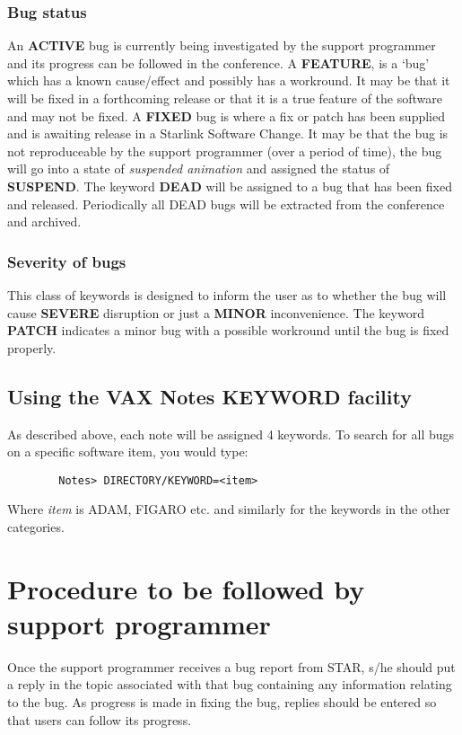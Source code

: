 \documentclass[twoside,11pt]{article}
\begin{document}
\subsubsection{Bug status}
An {\bf ACTIVE} bug is currently being investigated by the support programmer
and its progress can be followed in the conference. A {\bf FEATURE}, is a `bug'
which has a known cause/effect and possibly has a workround. 
It may be that it will be
fixed in a forthcoming release or that it is a true feature of the software and
may not be fixed. A {\bf FIXED} bug is where a fix or patch has been supplied 
and is awaiting release in a Starlink Software Change. It may be that the bug 
is not reproduceable by the support programmer (over a period of time), the 
bug will go into a state of {\em suspended animation} and assigned the status 
of {\bf SUSPEND}. The keyword {\bf DEAD} will be assigned to a bug that has
been fixed and released. Periodically all DEAD bugs will be extracted from the
conference and archived.
\subsubsection{Severity of bugs}
This class of keywords is designed to inform the user as to whether the bug
will cause {\bf SEVERE} disruption or just a {\bf MINOR} inconvenience. The
keyword {\bf PATCH} indicates a minor bug with a possible workround 
until the bug is fixed properly.
\subsection{Using the VAX Notes KEYWORD facility}
As described above, each note will be assigned 4 keywords. To search for all
bugs on a specific software item, you would type:
\begin{verbatim}
        Notes> DIRECTORY/KEYWORD=<item>  
\end{verbatim}
Where {\em item} is ADAM, FIGARO  etc.
and similarly for the keywords in the other categories.
\newpage
\section{Procedure to be followed by support programmer}
Once the support programmer receives a bug report from STAR, s/he should put a
reply in the topic associated with that bug containing any information relating
to the bug. As progress is made in fixing the bug, replies should be entered
so that users can follow its progress. 
\end{document}

